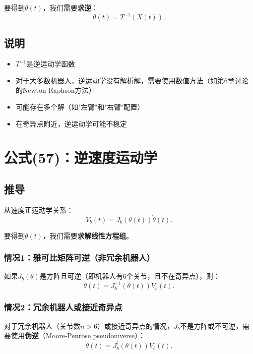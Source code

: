 \documentclass{article}
\begin{document}
要得到$\theta(t)$，我们需要\textbf{求逆}：
\begin{equation}
\theta(t) = T^{-1}(X(t)). \tag{56}
\end{equation}

\subsection{说明}

\begin{itemize}
\item $T^{-1}$是逆运动学函数
\item 对于大多数机器人，逆运动学没有解析解，需要使用数值方法（如第6章讨论的Newton-Raphson方法）
\item 可能存在多个解（如"左臂"和"右臂"配置）
\item 在奇异点附近，逆运动学可能不稳定
\end{itemize}

\section{公式(57)：逆速度运动学}

\subsection{推导}

从速度正运动学关系：
\begin{equation}
V_b(t) = J_b(\theta(t))\dot{\theta}(t).
\end{equation}

要得到$\dot{\theta}(t)$，我们需要\textbf{求解线性方程组}。

\subsubsection{情况1：雅可比矩阵可逆（非冗余机器人）}

如果$J_b(\theta)$是方阵且可逆（即机器人有6个关节，且不在奇异点），则：
\begin{equation}
\dot{\theta}(t) = J_b^{-1}(\theta(t))V_b(t).
\end{equation}

\subsubsection{情况2：冗余机器人或接近奇异点}

对于冗余机器人（关节数$n > 6$）或接近奇异点的情况，$J_b$不是方阵或不可逆，需要使用\textbf{伪逆}（Moore-Penrose pseudoinverse）：
\begin{equation}
\dot{\theta}(t) = J_b^{\dagger}(\theta(t))V_b(t). \tag{57}
\end{equation}
\end{document}
